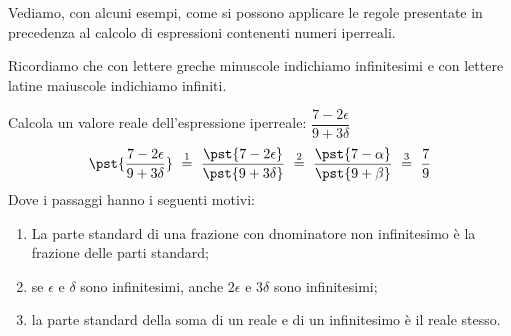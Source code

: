 
Vediamo, con alcuni esempi, come si possono applicare 
le regole presentate in precedenza al calcolo di espressioni 
contenenti numeri iperreali. 

Ricordiamo che con lettere greche minuscole indichiamo infinitesimi e con 
lettere latine maiuscole indichiamo infiniti.


\begin{esempio}
Calcola un valore reale dell'espressione iperreale: \quad
\(\dfrac{7 -2 \epsilon}{9 +3 \delta}\)
\[\pst{\dfrac{7 -2 \epsilon}{9 +3 \delta}} ~ \stackrel{1}{=} ~
  \dfrac{\pst{7 -2 \epsilon}}{\pst{9 +3 \delta}}~ \stackrel{2}{=} ~
  \dfrac{\pst{7 -\alpha}}{\pst{9 +\beta}} ~ \stackrel{3}{=} ~ 
\dfrac{7}{9}\]
Dove i passaggi hanno i seguenti motivi:
\begin{enumerate} [nosep] 
\item La parte standard di una frazione con dnominatore non infinitesimo
è la frazione delle parti standard;
\item se \(\epsilon \text{ e } \delta\) sono infinitesimi, 
anche \(2\epsilon\) e \(3 \delta\) sono infinitesimi;
\item la parte standard della soma di un reale e di un infinitesimo è il 
reale stesso.
\end{enumerate}
\end{esempio}


